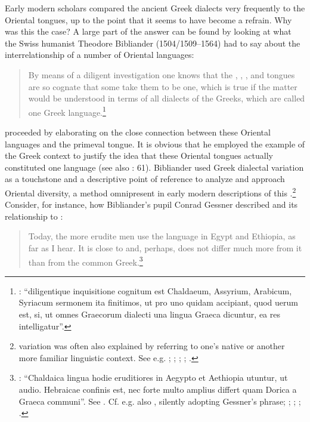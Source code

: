 Early modern scholars compared the ancient Greek dialects very frequently to the Oriental tongues, up to the point that it seems to have become a refrain. Why was this the case? A large part of the answer can be found by looking at what the Swiss humanist Theodore Bibliander (1504/1509–1564) had to say about the interrelationship of a number of Oriental languages:

\begin{quote}
By means of a diligent investigation one knows that the , , , and  tongues are so cognate that some take them to be one, which is true if the matter would be understood in terms of all dialects of the Greeks, which are called one Greek language.\footnote{\citet[58]{Bibliander1542}: “diligentique inquisitione cognitum est Chaldaeum, Assyrium, Arabicum, Syriacum sermonem ita finitimos, ut pro uno quidam accipiant, quod uerum est, si, ut omnes Graecorum dialecti una lingua Graeca dicuntur, ea res intelligatur”.}
\end{quote}

\citet[58--59]{Bibliander1542} proceeded by elaborating on the close connection between these Oriental languages and the primeval  tongue. It is obvious that he employed the example of the Greek context to justify the idea that these Oriental tongues actually constituted one language (see also \citealt{Metcalf2013}: 61). Bibliander used Greek dialectal variation as a touchstone and a descriptive point of reference to analyze and approach Oriental diversity, a method omnipresent in early modern descriptions of this .\footnote{ variation was often also explained by referring to one’s native or another more familiar linguistic context. See e.g. \citet[41]{Purchas1613}; \citet[197]{Kircher1679}; \citet[b.1\textsc{\textsuperscript{v}}]{Le1696}; \citet[\textsc{i.}230, 4th sequence of pagination]{Chambers1728}; \citet[57--58]{Kals1752}.} Consider, for instance, how Bibliander’s pupil Conrad Gessner described  and its relationship to :

\begin{quote}
Today, the more erudite men use the  language in Egypt and Ethiopia, as far as I hear. It is close to  and, perhaps, does not differ much more from it than  from the common Greek.\footnote{\citet[15\textsc{\textsuperscript{r}}]{Gessner1555}: “Chaldaica lingua hodie eruditiores in Aegypto et Aethiopia utuntur, ut audio. Hebraicae confinis est, nec forte multo amplius differt quam Dorica a Graeca communi”. See \citet[43]{Peters1970}. Cf. e.g. also \citet[325]{Rocca1591}, silently adopting Gessner’s phrase; \citet[459]{Saumaise1643a}; \citet[88]{Bagnati1732}; \citet[24]{Wesley1736}; \citet[22]{Eichhorn1780}.}
\end{quote}

